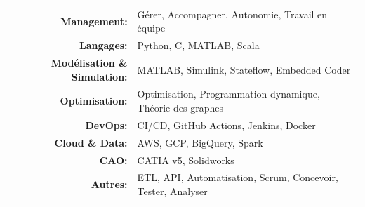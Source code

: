 \renewcommand{\arraystretch}{1.1}

	\begin{tabular}{>{}r>{}p{13cm}} 
	    \textbf{Management:} & Gérer, Accompagner, Autonomie, Travail en équipe\\
	    \textbf{Langages:} & Python, C, MATLAB, Scala\\
	    \textbf{Modélisation \& Simulation:} & MATLAB, Simulink, Stateflow, Embedded Coder\\
	    \textbf{Optimisation:} & Optimisation, Programmation dynamique, Théorie des graphes\\
	    \textbf{DevOps:} & CI/CD, GitHub Actions, Jenkins, Docker\\
	    \textbf{Cloud \& Data:} & AWS, GCP, BigQuery, Spark\\
	    \textbf{CAO:} & CATIA v5, Solidworks\\
	    \textbf{Autres:} & ETL, API, Automatisation, Scrum, Concevoir, Tester, Analyser\\
	\end{tabular}
